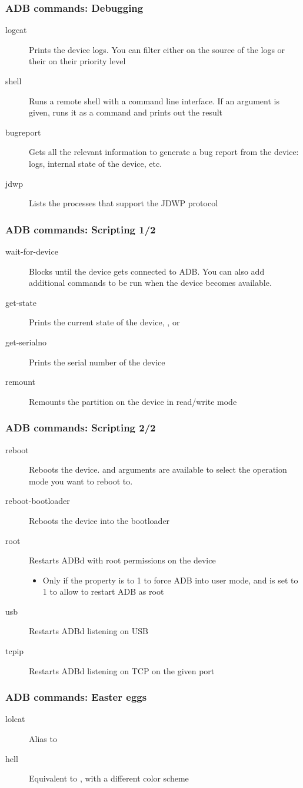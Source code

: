\begin{frame}
  \frametitle{ADB commands: Debugging}
  \begin{description}
  \item[logcat] Prints the device logs. You can filter either on
    the source of the logs or their on their priority level
  \item[shell] Runs a remote shell with a command line interface. If an
    argument is given, runs it as a command and prints out the result
  \item[bugreport] Gets all the relevant information to generate a
    bug report from the device: logs, internal state of the device, etc.
  \item[jdwp] Lists the processes that support the JDWP protocol
  \end{description}
\end{frame}

\begin{frame}
  \frametitle{ADB commands: Scripting 1/2}
  \begin{description}
  \item[wait-for-device] Blocks until the device gets connected to
    ADB. You can also add additional commands to
    be run when the device becomes available.
  \item[get-state] Prints the current state of the device,
    ,  or 
  \item[get-serialno] Prints the serial number of the device
  \item[remount] Remounts the  partition on the device
    in read/write mode
  \end{description}
\end{frame}

\begin{frame}
  \frametitle{ADB commands: Scripting 2/2}
  \begin{description}
  \item[reboot] Reboots the device.  and
     arguments are available to select the operation
    mode you want to reboot to.
  \item[reboot-bootloader] Reboots the device into the bootloader
  \item[root] Restarts ADBd with root permissions on the device
    \begin{itemize}
    \item Only if the  property is to 1 to force ADB
      into user mode, and  is set to 1 to allow
      to restart ADB as root
    \end{itemize}
  \item[usb] Restarts ADBd listening on USB
  \item[tcpip] Restarts ADBd listening on TCP on the given port
  \end{description}
\end{frame}

\begin{frame}
  \frametitle{ADB commands: Easter eggs}
  \begin{description}
  \item[lolcat] Alias to  
  \item[hell] Equivalent to , with a different
    color scheme
  \end{description}
\end{frame}
